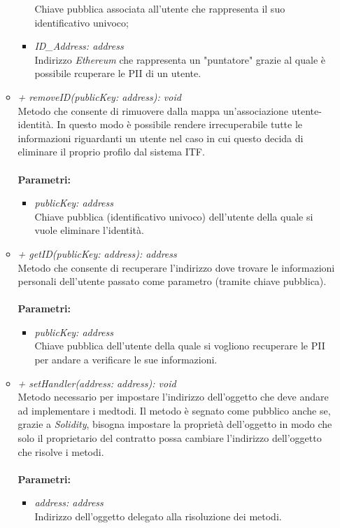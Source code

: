 \begin{itemize}
\begin{itemize}
\begin{itemize}
			Chiave pubblica associata all'utente che rappresenta il suo identificativo univoco;
			\item \textit{ID\_Address: address}\\
			Indirizzo \textit{Ethereum} che rappresenta un "puntatore" grazie al quale è possibile rcuperare le \gls{PII} di un utente.
		\end{itemize}
		\item \textit{+ removeID(publicKey: address): void}\\
		Metodo che consente di rimuovere dalla mappa un'associazione utente-identità. In questo modo è possibile rendere irrecuperabile tutte le informazioni riguardanti un utente nel caso in cui questo decida di eliminare il proprio profilo dal sistema \gls{ITF}.\\\\
		\textbf{Parametri:}
		\begin{itemize}
			\item \textit{publicKey: address}\\
			Chiave pubblica (identificativo univoco) dell'utente della quale si vuole eliminare l'identità.
		\end{itemize}
		\item \textit{+ getID(publicKey: address): address}\\
		Metodo che consente di recuperare l'indirizzo dove trovare le informazioni personali dell'utente passato come parametro (tramite chiave pubblica).\\\\
		\textbf{Parametri:}
		\begin{itemize}
			\item \textit{publicKey: address}\\
			Chiave pubblica dell'utente della quale si vogliono recuperare le \gls{PII} per andare a verificare le sue informazioni.
		\end{itemize}
		\item \textit{+ setHandler(address: address): void}\\
		Metodo necessario per impostare l'indirizzo dell'oggetto che deve andare ad implementare i medtodi. Il metodo è segnato come pubblico anche se, grazie a \textit{Solidity}, bisogna impostare la proprietà dell'oggetto in modo che solo il proprietario del contratto possa cambiare l'indirizzo dell'oggetto che risolve i metodi.\\\\
		\textbf{Parametri:}
		\begin{itemize}
			\item \textit{address: address}\\
			Indirizzo dell'oggetto delegato alla risoluzione dei metodi.
		\end{itemize}
	\end{itemize}
\end{itemize}
\newpage
